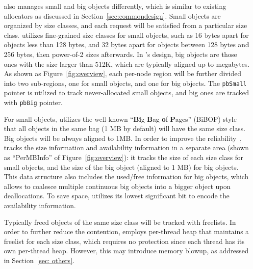 
\NM{} also manages small and big objects differently, which is similar to existing allocators as discussed in Section~\ref{sec:commondesign}. Small objects are organized by size classes, and each request will be satisfied from a particular size class. \NA{} utilizes fine-grained size classes for small objects, such as 16 bytes apart for objects less than 128 bytes, and 32 bytes apart for objects between 128 bytes and 256 bytes, then power-of-2 sizes afterwards. In \NM{}'s design, big objects are those ones with the size larger than 512K, which are typically aligned up to megabytes. As shown as Figure~\ref{fig:overview}, each per-node region will be further divided into two sub-regions, one for small objects, and one for big objects. The \texttt{pbSmall} pointer is utilized to track never-allocated small objects, and big ones are tracked with \texttt{pbBig} pointer. 

For small objects, \NM{} utilizes the well-known  ``\textbf{Bi}g-\textbf{B}ag-\textbf{o}f-\textbf{P}ages'' (BiBOP) style that all objects in the same bag (1 MB by default) will have the same size class. Big objects will be always aligned to 1MB. In order to improve the reliability~\citep{FreeGuard, Guarder}, \NM{} tracks the size information and availability information in a separate area (shown as ``PerMBInfo'' of Figure~\ref{fig:overview}): it tracks the size of each size class for small objects, and the size of the big object (aligned to 1 MB) for big objects. This data structure also includes the used/free information for big objects, which allows to coalesce multiple continuous big objects into a bigger object upon deallocations. To save space, \NM{} utilizes its lowest significant bit to encode the availability information.

Typically freed objects of the same size class will be tracked with freelists. In order to further reduce the contention, \NM{} employs per-thread heap that maintains a freelist for each size class, which requires no protection since each thread has its own per-thread heap. However, this may introduce memory blowup, as addressed in Section~\ref{sec: others}. 

